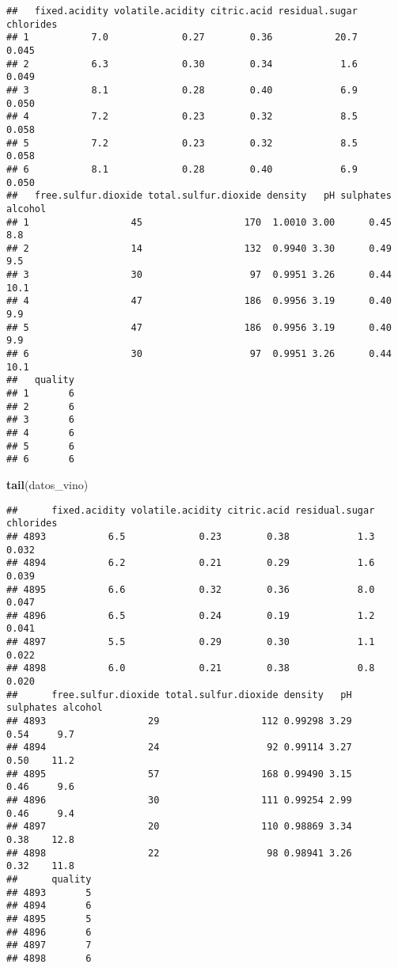 \documentclass[
]{article}
\newenvironment{Shaded}{\begin{snugshade}}{\end{snugshade}}
\newcommand{\FunctionTok}[1]{\textcolor[rgb]{0.13,0.29,0.53}{\textbf{#1}}}
\newcommand{\NormalTok}[1]{#1}
\begin{document}
\begin{verbatim}
##   fixed.acidity volatile.acidity citric.acid residual.sugar chlorides
## 1           7.0             0.27        0.36           20.7     0.045
## 2           6.3             0.30        0.34            1.6     0.049
## 3           8.1             0.28        0.40            6.9     0.050
## 4           7.2             0.23        0.32            8.5     0.058
## 5           7.2             0.23        0.32            8.5     0.058
## 6           8.1             0.28        0.40            6.9     0.050
##   free.sulfur.dioxide total.sulfur.dioxide density   pH sulphates alcohol
## 1                  45                  170  1.0010 3.00      0.45     8.8
## 2                  14                  132  0.9940 3.30      0.49     9.5
## 3                  30                   97  0.9951 3.26      0.44    10.1
## 4                  47                  186  0.9956 3.19      0.40     9.9
## 5                  47                  186  0.9956 3.19      0.40     9.9
## 6                  30                   97  0.9951 3.26      0.44    10.1
##   quality
## 1       6
## 2       6
## 3       6
## 4       6
## 5       6
## 6       6
\end{verbatim}

\begin{Shaded}
\begin{Highlighting}[]
\FunctionTok{tail}\NormalTok{(datos\_vino)}
\end{Highlighting}
\end{Shaded}

\begin{verbatim}
##      fixed.acidity volatile.acidity citric.acid residual.sugar chlorides
## 4893           6.5             0.23        0.38            1.3     0.032
## 4894           6.2             0.21        0.29            1.6     0.039
## 4895           6.6             0.32        0.36            8.0     0.047
## 4896           6.5             0.24        0.19            1.2     0.041
## 4897           5.5             0.29        0.30            1.1     0.022
## 4898           6.0             0.21        0.38            0.8     0.020
##      free.sulfur.dioxide total.sulfur.dioxide density   pH sulphates alcohol
## 4893                  29                  112 0.99298 3.29      0.54     9.7
## 4894                  24                   92 0.99114 3.27      0.50    11.2
## 4895                  57                  168 0.99490 3.15      0.46     9.6
## 4896                  30                  111 0.99254 2.99      0.46     9.4
## 4897                  20                  110 0.98869 3.34      0.38    12.8
## 4898                  22                   98 0.98941 3.26      0.32    11.8
##      quality
## 4893       5
## 4894       6
## 4895       5
## 4896       6
## 4897       7
## 4898       6
\end{verbatim}
\end{document}
